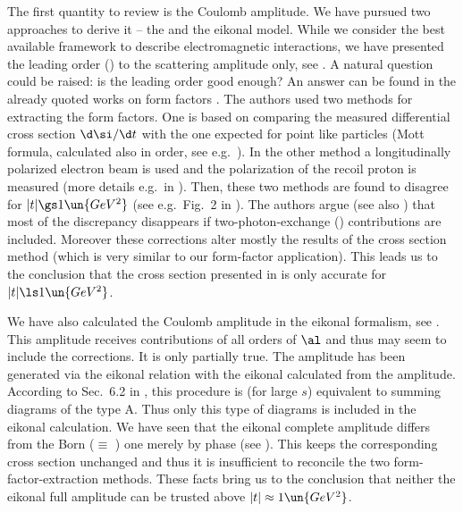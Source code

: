 The first quantity to review is the Coulomb amplitude. We have pursued two approaches to derive it -- the  and the eikonal model. While we consider  the best available framework to describe electromagnetic interactions, we have presented the leading order () to the scattering amplitude only, see . A natural question could be raised: is the leading order good enough? An answer can be found in the already quoted works on form factors . The authors used two methods for extracting the form factors. One is based on comparing the measured differential cross section $\d\si/\d t$ with the one expected for point like particles (Mott formula, calculated also in  order, see e.g.~). In the other method a longitudinally polarized electron beam is used and the polarization of the recoil proton is measured (more details e.g.~in ). Then, these two methods are found to disagree for $|t| \gs 1\un{GeV^2}$ (see e.g.~Fig.~2 in ). The authors argue (see also ) that most of the discrepancy disappears if two-photon-exchange () contributions are included. Moreover these corrections alter mostly the results of the cross section method (which is very similar to our form-factor application). This leads us to the conclusion that the  cross section presented in  is only accurate for $|t| \ls 1\un{GeV^2}$.

We have also calculated the Coulomb amplitude in the eikonal formalism, see . This amplitude receives contributions of all orders of $\al$ and thus may seem to include the  corrections. It is only partially true. The amplitude has been generated via the eikonal relation  with the eikonal calculated from the  amplitude. According to Sec.~6.2 in , this procedure is (for large $s$) equivalent to summing diagrams of the type  A. Thus only this type of diagrams is included in the eikonal calculation. We have seen that the eikonal complete amplitude differs from the Born ($\equiv$ ) one merely by phase (see ). This keeps the corresponding cross section unchanged and thus it is insufficient to reconcile the two form-factor-extraction methods. These facts bring us to the conclusion that neither the eikonal full amplitude can be trusted above $|t|\approx 1\un{GeV^2}$.


